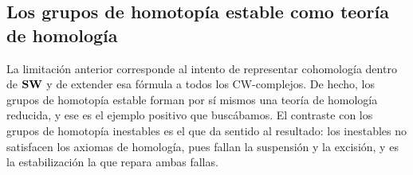 \subsection{Los grupos de homotopía estable como teoría de homología}

La limitación anterior corresponde al intento de representar cohomología dentro de $\mathbf{SW}$ y de extender esa fórmula a todos los CW-complejos. De hecho, los grupos de homotopía estable forman por sí mismos una teoría de homología reducida, y ese es el ejemplo positivo que buscábamos. El contraste con los grupos de homotopía inestables es el que da sentido al resultado: los inestables no satisfacen los axiomas de homología, pues fallan la suspensión y la excisión, y es la estabilización la que repara ambas fallas.

